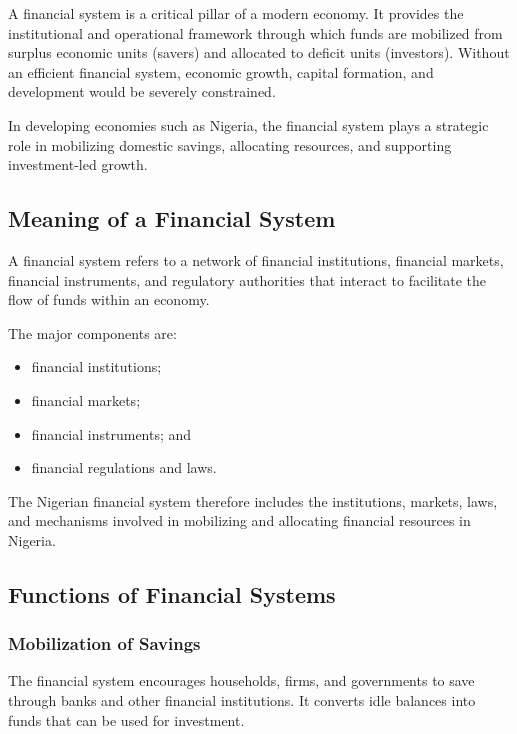 \documentclass[
]{article}
\providecommand{\tightlist}{%
  \setlength{\itemsep}{0pt}\setlength{\parskip}{0pt}}
\begin{document}
A financial system is a critical pillar of a modern economy. It provides the institutional and operational framework through which funds are mobilized from surplus economic units (savers) and allocated to deficit units (investors). Without an efficient financial system, economic growth, capital formation, and development would be severely constrained.

In developing economies such as Nigeria, the financial system plays a strategic role in mobilizing domestic savings, allocating resources, and supporting investment-led growth.

\subsection{Meaning of a Financial System}\label{meaning-of-a-financial-system}

A financial system refers to a network of financial institutions, financial markets, financial instruments, and regulatory authorities that interact to facilitate the flow of funds within an economy.

The major components are:

\begin{itemize}
\tightlist
\item
  financial institutions;
\item
  financial markets;
\item
  financial instruments; and
\item
  financial regulations and laws.
\end{itemize}

The Nigerian financial system therefore includes the institutions, markets, laws, and mechanisms involved in mobilizing and allocating financial resources in Nigeria.

\subsection{Functions of Financial Systems}\label{functions-of-financial-systems}

\subsubsection{Mobilization of Savings}\label{mobilization-of-savings}

The financial system encourages households, firms, and governments to save through banks and other financial institutions. It converts idle balances into funds that can be used for investment.
\end{document}
